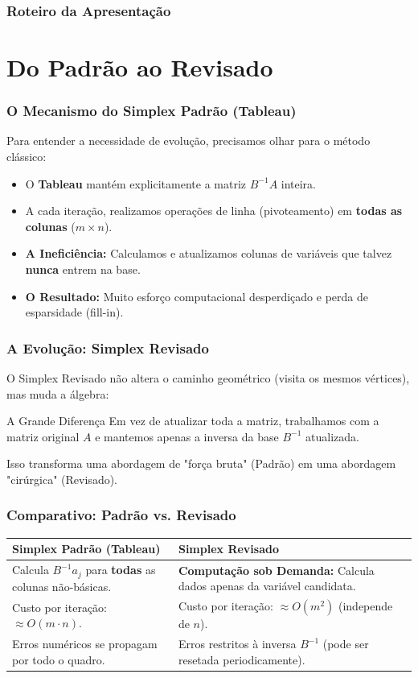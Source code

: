 \begin{frame}
\frametitle{Roteiro da Apresentação}
\tableofcontents
\end{frame}

\section{Do Padrão ao Revisado}

\begin{frame}
\frametitle{O Mecanismo do Simplex Padrão (Tableau)}
Para entender a necessidade de evolução, precisamos olhar para o método clássico:
\vspace{0.3cm}
\begin{itemize}
    \item O \textbf{Tableau} mantém explicitamente a matriz $B^{-1}A$ inteira.
    \item A cada iteração, realizamos operações de linha (pivoteamento) em \textbf{todas as colunas} ($m \times n$).
    \item \textbf{A Ineficiência:} Calculamos e atualizamos colunas de variáveis que talvez \textbf{nunca} entrem na base.
    \item \textbf{O Resultado:} Muito esforço computacional desperdiçado e perda de esparsidade (fill-in).
\end{itemize}
\end{frame}

\begin{frame}
\frametitle{A Evolução: Simplex Revisado}
O Simplex Revisado não altera o caminho geométrico (visita os mesmos vértices), mas muda a álgebra:
\vspace{0.3cm}
\begin{block}{A Grande Diferença}
    Em vez de atualizar toda a matriz, trabalhamos com a matriz original $A$ e mantemos apenas a inversa da base $B^{-1}$ atualizada.
\end{block}
\vspace{0.2cm}
Isso transforma uma abordagem de "força bruta" (Padrão) em uma abordagem "cirúrgica" (Revisado).
\end{frame}

\begin{frame}
\frametitle{Comparativo: Padrão vs. Revisado}
\begin{table}[]
\centering
\small
\begin{tabular}{p{}|p{}}
\hline
\textbf{Simplex Padrão (Tableau)} & \textbf{Simplex Revisado} \\ \hline
Calcula $B^{-1}a_j$ para \textbf{todas} as colunas não-básicas. & \textbf{Computação sob Demanda:} Calcula dados apenas da variável candidata. \\ \hline
Custo por iteração: $\approx O(m \cdot n)$. & Custo por iteração: $\approx O(m^2)$ (independe de $n$). \\ \hline
Erros numéricos se propagam por todo o quadro. & Erros restritos à inversa $B^{-1}$ (pode ser resetada periodicamente). \\ \hline
\end{tabular}
\end{table}
\end{frame}

